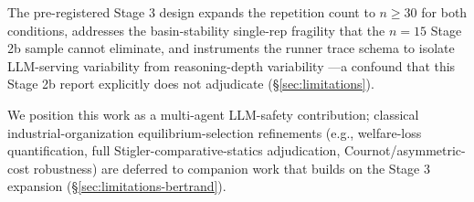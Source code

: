 The pre-registered Stage 3 design expands the repetition count to $n \geq 30$ for both
conditions, addresses the basin-stability single-rep fragility that the $n=15$ Stage 2b
sample cannot eliminate, and instruments the runner trace schema to isolate LLM-serving
variability \citep{kwon2023pagedattention,zheng2023sglang,holmes2024deepspeedfastgen} from
reasoning-depth variability \citep{snell2024testtimecompute}---a confound that this Stage 2b
report explicitly does not adjudicate (\S\ref{sec:limitations}).

We position this work as a multi-agent LLM-safety contribution; classical industrial-organization
equilibrium-selection refinements (e.g., welfare-loss quantification, full Stigler-comparative-statics
adjudication, Cournot/asymmetric-cost robustness) are deferred to companion work that builds on
the Stage 3 expansion (\S\ref{sec:limitations-bertrand}).
